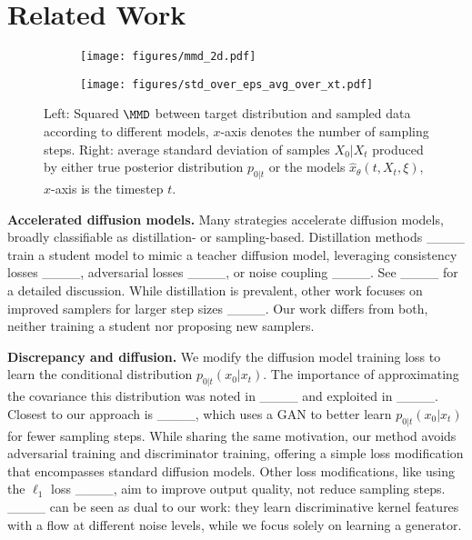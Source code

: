 \section{Related Work}
\label{sec:relatedWork}
\begin{figure}
    \centering
    \begin{subfigure}
        \centering
        \texttt{[image: figures/mmd\_2d.pdf]}
        \label{fig:2d_mmd}
    \end{subfigure}
    \hfill
    \begin{subfigure}
        \centering
        \texttt{[image: figures/std\_over\_eps\_avg\_over\_xt.pdf]}
        \label{fig:2d_stds}
    \end{subfigure}
    \caption{Left: Squared $\MMD$ between target distribution and sampled data according to different models, $x$-axis denotes the number of sampling steps. Right: average standard deviation of samples $X_0 | X_t$ produced by either true posterior distribution $p_{0 \vert t}$ or the models $\hat{x}_{\theta}(t,X_{t},\xi)$, $x$-axis is the timestep $t$.}
    \label{fig:2d_metrics}
\end{figure}

\textbf{Accelerated diffusion models.} Many strategies accelerate diffusion models, broadly classifiable as distillation- or sampling-based.  Distillation methods ____ train a student model to mimic a teacher diffusion model, leveraging consistency losses ____, adversarial losses ____, or noise coupling ____. See ____ for a detailed discussion.  While distillation is prevalent, other work focuses on improved samplers for larger step sizes ____.  Our work differs from both, neither training a student nor proposing new samplers.

\textbf{Discrepancy and diffusion.} We modify the diffusion model training loss to learn the conditional distribution $p_{0|t}(x_0|x_t)$.  The importance of approximating the covariance this distribution was noted in ____ and exploited in ____.  Closest to our approach is ____, which uses a GAN to better learn $p_{0|t}(x_0|x_t)$ for fewer sampling steps.  While sharing the same motivation, our method avoids adversarial training and discriminator training, offering a simple loss modification that encompasses standard diffusion models.  Other loss modifications, like using the $\ell_1$ loss ____, aim to improve output quality, not reduce sampling steps.  ____ can be seen as dual to our work: they learn discriminative kernel features with a flow at different noise levels, while we focus solely on learning a generator.

